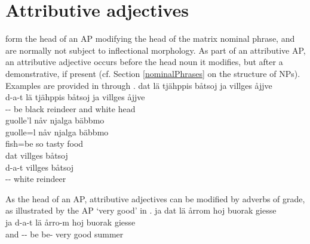 \section{Attributive adjectives}\label{adjectivesATTR}
 form the head of an AP modifying the head of the matrix nominal phrase, and are normally not subject to inflectional morphology. 
As part of an attributive AP, an attributive adjective occurs before the head noun it modifies, but after a demonstrative, if present (cf. Section \ref{nominalPhrases} on the structure of NPs). Examples are provided in  through . 
\ea\label{adjEx1}
\glll	dat lä tjähppis båtsoj ja villges åjjve\\
	d-a-t lä tjähppis båtsoj ja villges åjjve\\
	-- be\BS{} black reindeer\BS{} and white head\BS{}\\\nopagebreak
{}	
\z
\ea\label{adjEx2}
\glll	guolle'l nåv njalga bäbbmo\\
	guolle=l nåv njalga bäbbmo\\
	fish\BS{}=be\BS{} so tasty food\BS{}\\\nopagebreak
{}	
\z
\ea\label{adjEx3}
\glll	dat villges båtsoj\\
	d-a-t villges båtsoj\\
	-- white reindeer\BS{}\\\nopagebreak
{}	
\z

As the head of an AP, attributive adjectives can be modified by adverbs of grade, as illustrated by the AP  ‘very good’ in .
\ea\label{adjEx4}
\glll	ja dat lä årrom hoj buorak giesse\\
	ja d-a-t lä årro-m hoj buorak giesse\\
	and -- be\BS{} be- very good summer\BS{}\\\nopagebreak
{}	
\z

